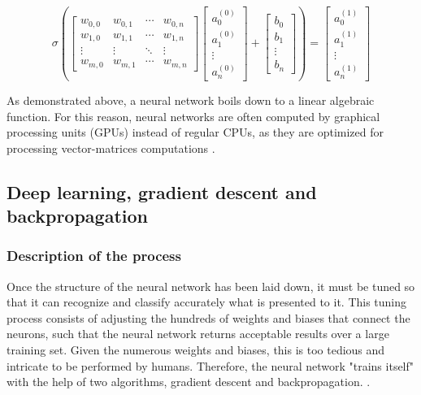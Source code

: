 \documentclass[12pt,a4paper,notitlepage]{article}
\begin{document}
\begin{displaymath}
	\sigma
	\left(
	\begin{bmatrix}
		w_{0,0} & w_{0,1} & \cdots & w_{0,n}\\
		w_{1,0} & w_{1,1} & \cdots & w_{1,n}\\
		\vdots & \vdots & \ddots & \vdots\\
		w_{m,0} & w_{m,1} & \cdots & w_{m,n}
	\end{bmatrix}
	\begin{bmatrix}
		a_{0}^{(0)}\\
		a_{1}^{(0)}\\
		\vdots\\
		a_{n}^{(0)}
	\end{bmatrix}
	+
	\begin{bmatrix}
		b_{0}\\
		b_{1}\\
		\vdots\\
		b_{n}
	\end{bmatrix}
	\right)
	=
	\begin{bmatrix}
		a_{0}^{(1)}\\
		a_{1}^{(1)}\\
		\vdots\\
		a_{n}^{(1)}
	\end{bmatrix}
\end{displaymath}

As demonstrated above, a neural network boils down to a linear algebraic function. For this reason, neural networks are often computed by graphical processing units (GPUs) instead of regular CPUs, as they are optimized for processing vector-matrices computations \cite{salter_cart_2021}.

\subsection{Deep learning, gradient descent and backpropagation}\label{deep-learning}
\subsubsection{Description of the process}
Once the structure of the neural network has been laid down, it must be tuned so that it can recognize and classify accurately what is presented to it. This tuning process consists of adjusting the hundreds of weights and biases that connect the neurons, such that the neural network returns acceptable results over a large training set. Given the numerous weights and biases, this is too tedious and intricate to be performed by humans. Therefore, the neural network "trains itself" with the help of two algorithms, gradient descent and backpropagation. \cite{ibm_cloud_education_what_2020}.
\end{document}
